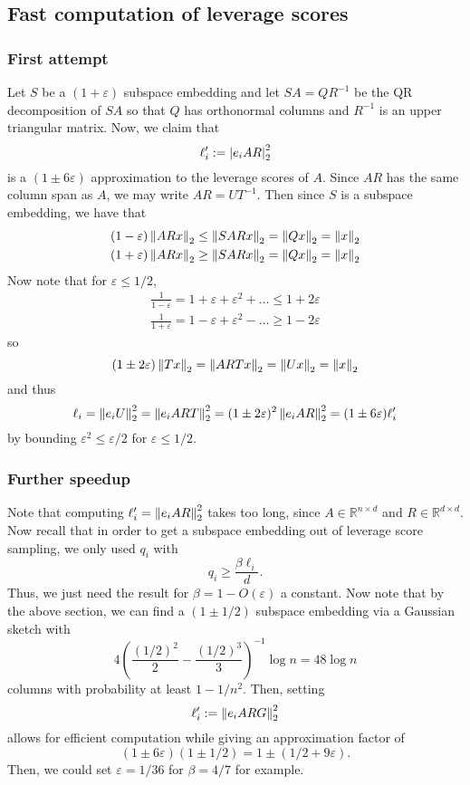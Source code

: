 \documentclass{article}
\begin{document}
\subsection{Fast computation of leverage scores}
\subsubsection{First attempt}
Let $S$ be a $(1+\varepsilon)$ subspace embedding and let $SA = QR^{-1}$ be the QR decomposition of $SA$ so that $Q$ has orthonormal columns and $R^{-1}$ is an upper triangular matrix. Now, we claim that
\[
	\ell_i' := \left\vert e_iAR\right\vert_2^2
\]
is a $(1\pm 6\varepsilon)$ approximation to the leverage scores of $A$. Since $AR$ has the same column span as $A$, we may write $AR = UT^{-1}$. Then since $S$ is a subspace embedding, we have that
\begin{align*}
	(1-\varepsilon)\left\Vert ARx\right\Vert_2\leq\left\Vert SARx\right\Vert_2 = \left\Vert Qx\right\Vert_2 = \left\Vert x\right\Vert_2 \\
	(1+\varepsilon)\left\Vert ARx\right\Vert_2\geq\left\Vert SARx\right\Vert_2 = \left\Vert Qx\right\Vert_2 = \left\Vert x\right\Vert_2
\end{align*}
Now note that for $\varepsilon\leq1/2$,
\begin{align*}
	\frac1{1-\varepsilon} = 1+\varepsilon+\varepsilon^2+\dots\leq 1+2\varepsilon \\
	\frac1{1+\varepsilon} = 1-\varepsilon+\varepsilon^2-\dots\geq 1-2\varepsilon
\end{align*}
so
\[
	(1\pm2\varepsilon)\left\Vert Tx\right\Vert_2 = \left\Vert ARTx\right\Vert_2 = \left\Vert Ux\right\Vert_2 = \left\Vert x\right\Vert_2
\]
and thus
\[
	\ell_i = \left\Vert e_iU\right\Vert_2^2 = \left\Vert e_iART\right\Vert_2^2 = (1\pm2\varepsilon)^2\left\Vert e_iAR\right\Vert_2^2 = (1\pm6\varepsilon)\ell_i'
\]
by bounding $\varepsilon^2\leq\varepsilon/2$ for $\varepsilon\leq1/2$. 

\subsubsection{Further speedup}
Note that computing $\ell_i' = \left\Vert e_i AR\right\Vert_2^2$ takes too long, since $A\in\mathbb R^{n\times d}$ and $R\in\mathbb R^{d\times d}$. Now recall that in order to get a subspace embedding out of leverage score sampling, we only used $q_i$ with
\[
	q_i\geq \frac{\beta\ell_i}{d}.
\]
Thus, we just need the result for $\beta = 1-O(\varepsilon)$ a constant. Now note that by the above section, we can find a $(1\pm1/2)$ subspace embedding via a Gaussian sketch with
\[
	4\left(\frac{(1/2)^2}2 - \frac{(1/2)^3}3\right)^{-1}\log n = 48\log n
\]
columns with probability at least $1-1/n^2$. Then, setting
\[
	\ell_i' := \left\Vert e_i ARG\right\Vert_2^2
\]
allows for efficient computation while giving an approximation factor of
\[
	(1\pm6\varepsilon)(1\pm1/2) = 1\pm(1/2+9\varepsilon).
\]
Then, we could set $\varepsilon = 1/36$ for $\beta = 4/7$ for example. 
\end{document}
